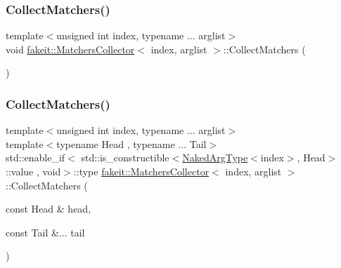 \mbox{\label{classfakeit_1_1MatchersCollector_a2d9a08a347c3915daa33f307a274f13c}} 
\subsubsection{\texorpdfstring{CollectMatchers()}{CollectMatchers()}\hspace{0.1cm}{\footnotesize\ttfamily [15/63]}}
{\footnotesize\ttfamily template$<$unsigned int index, typename ... arglist$>$ \\
void \mbox{\hyperlink{classfakeit_1_1MatchersCollector}{fakeit\+::\+Matchers\+Collector}}$<$ index, arglist $>$\+::Collect\+Matchers (\begin{DoxyParamCaption}{ }\end{DoxyParamCaption})\hspace{0.3cm}{\ttfamily [inline]}}

\mbox{\label{classfakeit_1_1MatchersCollector_a29c5245d03b8fab3773455c087edde74}} 
\subsubsection{\texorpdfstring{CollectMatchers()}{CollectMatchers()}\hspace{0.1cm}{\footnotesize\ttfamily [16/63]}}
{\footnotesize\ttfamily template$<$unsigned int index, typename ... arglist$>$ \\
template$<$typename Head , typename ... Tail$>$ \\
std\+::enable\+\_\+if$<$ std\+::is\+\_\+constructible$<$\mbox{\hyperlink{classfakeit_1_1MatchersCollector_aeda8ced6a2f0cb7c6e4f916f18a91730}{Naked\+Arg\+Type}}$<$index$>$, Head$>$\+::value , void$>$\+::type \mbox{\hyperlink{classfakeit_1_1MatchersCollector}{fakeit\+::\+Matchers\+Collector}}$<$ index, arglist $>$\+::Collect\+Matchers (\begin{DoxyParamCaption}\item[{const Head \&}]{head,  }\item[{const Tail \&...}]{tail }\end{DoxyParamCaption})\hspace{0.3cm}{\ttfamily [inline]}}

